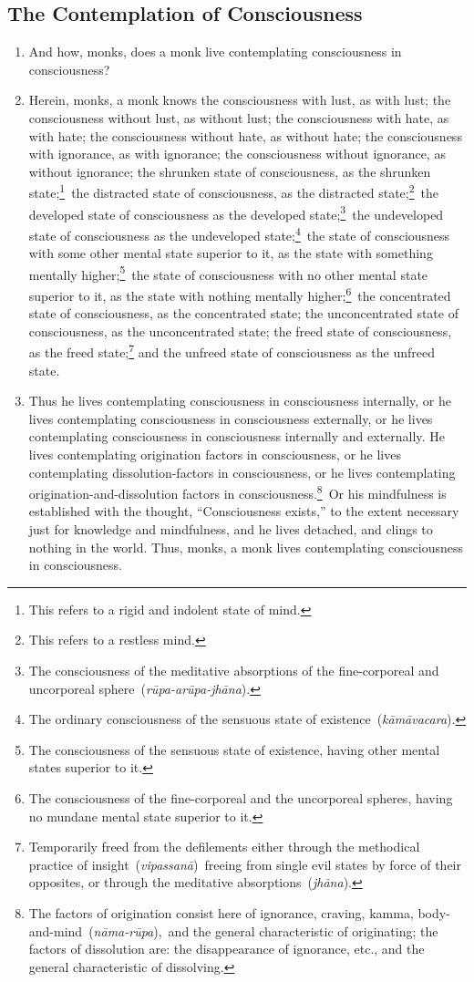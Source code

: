 \documentclass[a4 paper, 12pt]{article}
\begin{document}
\begin{multicols}{2}
\subsection*{The Contemplation of Consciousness}
\begin{enumerate}[resume]
\item And how, monks, does a monk live contemplating consciousness in consciousness?
\item Herein, monks, a monk knows the consciousness with lust, as with lust; the consciousness without lust, as without lust; the consciousness with hate, as with hate; the consciousness without hate, as without hate; the consciousness with ignorance, as with ignorance; the consciousness without ignorance, as without ignorance; the shrunken state of consciousness, as the shrunken state;\footnote{This refers to a rigid and indolent state of mind.} the distracted state of consciousness, as the distracted state;\footnote{This refers to a restless mind.} the developed state of consciousness as the developed state;\footnote{The consciousness of the meditative absorptions of the fine-corporeal and uncorporeal sphere (\textit{rūpa-arūpa-jhāna}).} the undeveloped state of consciousness as the undeveloped state;\footnote{The ordinary consciousness of the sensuous state of existence (\textit{kāmāvacara}).} the state of consciousness with some other mental state superior to it, as the state with something mentally higher;\footnote{The consciousness of the sensuous state of existence, having other mental states superior to it.} the state of consciousness with no other mental state superior to it, as the state with nothing mentally higher;\footnote{The consciousness of the fine-corporeal and the uncorporeal spheres, having no mundane mental state superior to it.} the concentrated state of consciousness, as the concentrated state; the unconcentrated state of consciousness, as the unconcentrated state; the freed state of consciousness, as the freed state;\footnote{Temporarily freed from the defilements either through the methodical practice of insight (\textit{vipassanā}) freeing from single evil states by force of their opposites, or through the meditative absorptions (\textit{jhāna}).} and the unfreed state of consciousness as the unfreed state.
\item Thus he lives contemplating consciousness in consciousness internally, or he lives contemplating consciousness in consciousness externally, or he lives contemplating  consciousness in consciousness internally and externally. He lives contemplating origination factors in consciousness, or he lives contemplating dissolution-factors in consciousness, or he lives contemplating origination-and-dissolution factors in consciousness.\footnote{The factors of origination consist here of ignorance, craving, kamma, body-and-mind (\textit{nāma-rūpa}), and the general characteristic of originating; the factors of dissolution are: the disappearance of ignorance, etc., and the general characteristic of dissolving.} Or his mindfulness is established with the thought, “Consciousness exists,” to the extent necessary just for knowledge and mindfulness, and he lives detached, and clings to nothing in the world. Thus, monks, a monk lives contemplating consciousness in consciousness.

\end{enumerate}
\end{multicols}
\end{document}

